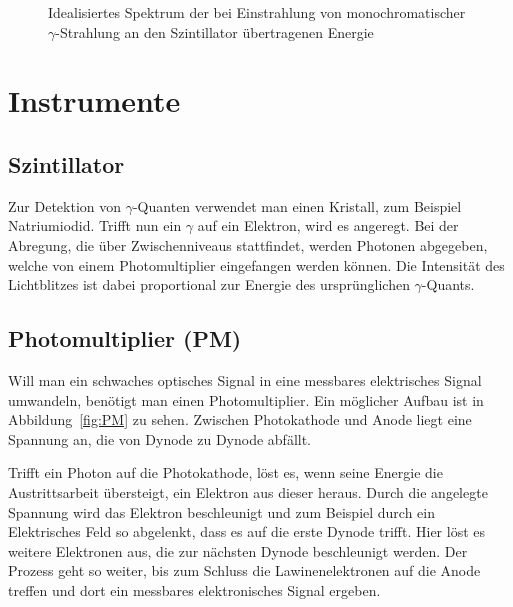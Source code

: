 \begin{figure}[htbp]
    \centering
    \caption{%
        Idealisiertes Spektrum der bei Einstrahlung von monochromatischer
        $\gamma$-Strahlung an den Szintillator übertragenen Energie
    }
    \label{fig:Compton}
\end{figure}

\section{Instrumente}

\subsection{Szintillator}

Zur Detektion von $\gamma$-Quanten verwendet man einen Kristall, zum Beispiel
Natriumiodid. Trifft nun ein $\gamma$ auf ein Elektron, wird es angeregt. Bei
der Abregung, die über Zwischenniveaus stattfindet, werden Photonen abgegeben,
welche von einem Photomultiplier eingefangen werden können. Die Intensität des
Lichtblitzes ist dabei proportional zur Energie des ursprünglichen
$\gamma$-Quants.

\subsection{Photomultiplier (PM)}

Will man ein schwaches optisches Signal in eine messbares elektrisches Signal
umwandeln, benötigt man einen Photomultiplier. Ein möglicher Aufbau ist in
Abbildung~\ref{fig:PM} zu sehen. Zwischen Photokathode und Anode liegt eine
Spannung an, die von Dynode zu Dynode abfällt.

Trifft ein Photon auf die Photokathode, löst es, wenn seine Energie die
Austrittsarbeit übersteigt, ein Elektron aus dieser heraus. Durch die angelegte
Spannung wird das Elektron beschleunigt und zum Beispiel durch ein Elektrisches
Feld so abgelenkt, dass es auf die erste Dynode trifft. Hier löst es weitere
Elektronen aus, die zur nächsten Dynode beschleunigt werden. Der Prozess geht
so weiter, bis zum Schluss die Lawinenelektronen auf die Anode treffen und dort
ein messbares elektronisches Signal ergeben.

